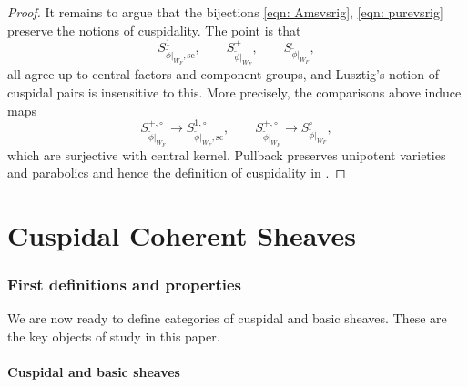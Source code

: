 \documentclass{amsart}
\theoremstyle{definition}
\theoremstyle{remark}
\numberwithin{equation}{section}
\newcommand{\Sc}{\mathrm{sc}}
\begin{document}
\begin{proof}
It remains to argue that the bijections \eqref{eqn: Amsvsrig}, \eqref{eqn: purevsrig} preserve the notions of cuspidality. The point is that 
\begin{equation*}
    S^1_{\tilde{\phi}|_{W_F}, \Sc}, \qquad S^+_{\tilde{\phi}|_{W_F}}, \qquad S_{\tilde{\phi}|_{W_F}},
\end{equation*}
all agree up to central factors and component groups, and Lusztig's notion of cuspidal pairs is insensitive to this. More precisely, the comparisons above induce maps
\begin{equation*}
    S^{+, \circ}_{\tilde{\phi}|_{W_F}} \rightarrow S^{1,  \circ}_{\tilde{\phi}|_{W_F}, \Sc}, \qquad   S^{+, \circ}_{\tilde{\phi}|_{W_F}} \rightarrow S^{  \circ}_{\tilde{\phi}|_{W_F}},
\end{equation*}
which are surjective with central kernel. Pullback preserves unipotent varieties and parabolics and hence the definition of cuspidality in \cite[Definition 2.4]{LusztigIntersection}.
\end{proof}

\part{Cuspidal Coherent Sheaves}{\label{p: cuspidalsheaves}}

\section{First definitions and properties}{\label{s: cuspsheavesdef}}

We are now ready to define categories of cuspidal and basic sheaves. These are the key objects of study in this paper.

\subsection{Cuspidal and basic sheaves}{\label{ss: defncuspsheaves}}
\end{document}

